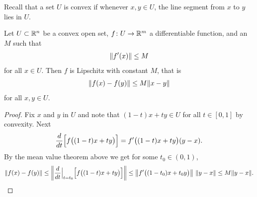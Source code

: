 Recall that a set $U$ is convex
if whenever $x,y \in U$, the line segment from
$x$ to $y$ lies in $U$.

\begin{prop} \label{mv:prop:convexlip}
Let $U \subset {\mathbb{R}}^n$ be a convex open set, $f \colon U \to {\mathbb{R}}^m$
a differentiable function, and an $M$ such that
\begin{equation*}
\lVert {f'(x)} \rVert \leq M
\end{equation*}
for all $x \in U$.  Then $f$ is Lipschitz with constant $M$, that is
\begin{equation*}
\lVert {f(x)-f(y)} \rVert \leq M \lVert {x-y} \rVert
\end{equation*}
for all $x,y \in U$.
\end{prop}

\begin{proof}
Fix $x$ and $y$ in $U$ and note that
$(1-t)x+ty \in U$ for all $t \in [0,1]$
by convexity.
Next
\begin{equation*}
\frac{d}{dt} \Bigl[f\bigl((1-t)x+ty\bigr)\Bigr]
=
f'\bigl((1-t)x+ty\bigr) (y-x) .
\end{equation*}
By the mean value theorem above we get for
some $t_0 \in (0,1)$,
\begin{equation*}
\lVert {f(x)-f(y)} \rVert \leq
\left\lVert {\frac{d}{dt} \Big|_{t=t_0} \Bigl[ f\bigl((1-t)x+ty\bigr) \Bigr] } \right\rVert \leq
\left\lVert {f'\bigl((1-t_0)x+t_0y\bigr)} \right\rVert \, \lVert {y-x} \rVert \leq
M \lVert {y-x} \rVert . \qedhere
\end{equation*}
\end{proof}

